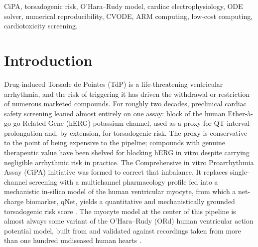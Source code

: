 \documentclass[journal]{IEEEtran}
\begin{document}
\begin{IEEEkeywords}
CiPA, torsadogenic risk, O'Hara--Rudy model, cardiac electrophysiology, ODE solver, numerical reproducibility, CVODE, ARM computing, low-cost computing, cardiotoxicity screening.
\end{IEEEkeywords}

\section{Introduction}

Drug-induced Torsade de Pointes (TdP) is a life-threatening ventricular arrhythmia, and the risk of triggering it has driven the withdrawal or restriction of numerous marketed compounds. For roughly two decades, preclinical cardiac safety screening leaned almost entirely on one assay: block of the human Ether-\`a-go-go-Related Gene (hERG) potassium channel, used as a proxy for QT-interval prolongation and, by extension, for torsadogenic risk. The proxy is conservative to the point of being expensive to the pipeline; compounds with genuine therapeutic value have been shelved for blocking hERG in vitro despite carrying negligible arrhythmic risk in practice. The Comprehensive in vitro Proarrhythmia Assay (CiPA) initiative was formed to correct that imbalance. It replaces single-channel screening with a multichannel pharmacology profile fed into a mechanistic in-silico model of the human ventricular myocyte, from which a net-charge biomarker, qNet, yields a quantitative and mechanistically grounded torsadogenic risk score \cite{li2017}. The myocyte model at the center of this pipeline is almost always some variant of the O'Hara--Rudy (ORd) human ventricular action potential model, built from and validated against recordings taken from more than one hundred undiseased human hearts \cite{ohara2011}.
\end{document}
